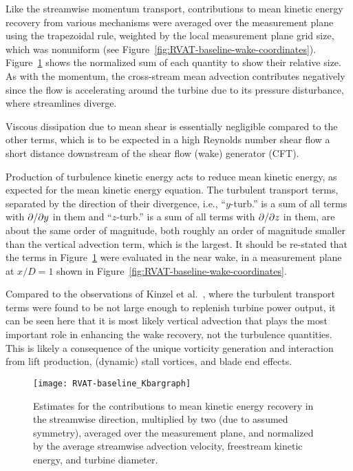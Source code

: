 Like the streamwise momentum transport, contributions to mean kinetic energy
recovery from various mechanisms were averaged over the  measurement plane using
the trapezoidal rule, weighted by the local measurement plane grid size, which
was nonuniform (see Figure~\ref{fig:RVAT-baseline-wake-coordinates}).
Figure~\ref{fig:RVAT-baseline-Kbargraph} shows the normalized sum of each
quantity to show their relative size. As with the momentum, the cross-stream
mean advection contributes negatively since the flow is accelerating around the
turbine due to its pressure disturbance, where streamlines diverge.

Viscous dissipation due to mean shear is essentially negligible compared to
the other terms, which is to be expected in a high Reynolds number shear flow a 
short distance downstream of the shear flow (wake) generator (CFT).

Production of turbulence kinetic energy acts to reduce mean kinetic energy, as
expected for the mean kinetic energy equation. The turbulent transport terms,
separated by the direction of their divergence, i.e., ``$y$-turb.'' is a sum of
all terms with $\partial / \partial y$ in them and ``$z$-turb.'' is a sum of all terms with
$\partial / \partial z$ in them, are about the same order of magnitude, both roughly an
order of magnitude smaller than the vertical advection term, which is the
largest. It should be re-stated that the terms in
Figure~\ref{fig:RVAT-baseline-Kbargraph} were evaluated in the near wake, in a
measurement plane at $x/D=1$ shown in
Figure~\ref{fig:RVAT-baseline-wake-coordinates}.

Compared to the observations of Kinzel et al.~\cite{Kinzel2012}, where the
turbulent transport terms were found to be not large enough to replenish turbine
power output, it can be seen here that it is most likely vertical advection that
plays the most important role in enhancing the wake recovery, not the turbulence
quantities. This is likely a consequence of the unique vorticity generation and
interaction from lift production, (dynamic) stall vortices, and blade end
effects.

\begin{figure}
    \centering
    
    \texttt{[image: RVAT-baseline\_Kbargraph]}

    \caption{Estimates for the contributions to mean kinetic energy recovery in
        the streamwise direction, multiplied by two (due to assumed symmetry),
        averaged over the measurement plane, and normalized by the average
        streamwise advection velocity, freestream kinetic energy, and turbine
        diameter.}
    
    \label{fig:RVAT-baseline-Kbargraph}
\end{figure}


